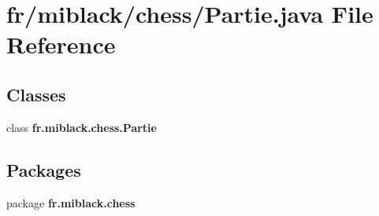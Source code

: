 \section{fr/miblack/chess/\-Partie.java File Reference}
\label{Partie_8java}
\subsection*{Classes}
\begin{DoxyCompactItemize}
\item 
class {\bf fr.\-miblack.\-chess.\-Partie}
\end{DoxyCompactItemize}
\subsection*{Packages}
\begin{DoxyCompactItemize}
\item 
package {\bf fr.\-miblack.\-chess}
\end{DoxyCompactItemize}
